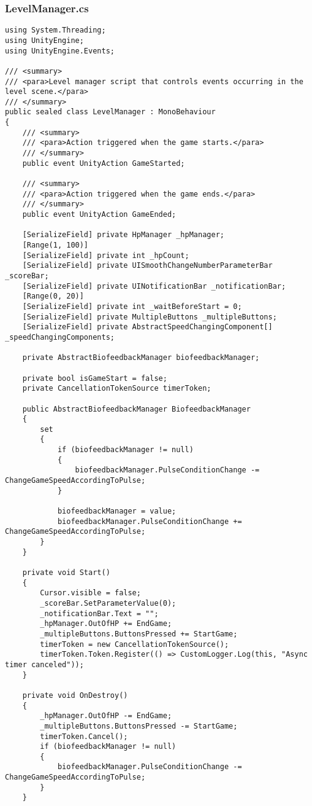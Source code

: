 \subsubsection*{LevelManager.cs}
\begin{verbatim}
using System.Threading;
using UnityEngine;
using UnityEngine.Events;

/// <summary>
/// <para>Level manager script that controls events occurring in the level scene.</para>
/// </summary>
public sealed class LevelManager : MonoBehaviour
{
    /// <summary>
    /// <para>Action triggered when the game starts.</para>
    /// </summary>
    public event UnityAction GameStarted;

    /// <summary>
    /// <para>Action triggered when the game ends.</para>
    /// </summary>
    public event UnityAction GameEnded;

    [SerializeField] private HpManager _hpManager;
    [Range(1, 100)] 
    [SerializeField] private int _hpCount;
    [SerializeField] private UISmoothChangeNumberParameterBar _scoreBar;
    [SerializeField] private UINotificationBar _notificationBar;
    [Range(0, 20)]
    [SerializeField] private int _waitBeforeStart = 0;
    [SerializeField] private MultipleButtons _multipleButtons;
    [SerializeField] private AbstractSpeedChangingComponent[] _speedChangingComponents;
    
    private AbstractBiofeedbackManager biofeedbackManager;

    private bool isGameStart = false;
    private CancellationTokenSource timerToken;

    public AbstractBiofeedbackManager BiofeedbackManager
    {
        set
        {
            if (biofeedbackManager != null)
            {
                biofeedbackManager.PulseConditionChange -= ChangeGameSpeedAccordingToPulse;
            }

            biofeedbackManager = value;
            biofeedbackManager.PulseConditionChange += ChangeGameSpeedAccordingToPulse;
        }
    }

    private void Start()
    {
        Cursor.visible = false;
        _scoreBar.SetParameterValue(0);
        _notificationBar.Text = "";
        _hpManager.OutOfHP += EndGame;
        _multipleButtons.ButtonsPressed += StartGame;
        timerToken = new CancellationTokenSource();
        timerToken.Token.Register(() => CustomLogger.Log(this, "Async timer canceled"));
    }

    private void OnDestroy()
    {
        _hpManager.OutOfHP -= EndGame;
        _multipleButtons.ButtonsPressed -= StartGame;
        timerToken.Cancel();
        if (biofeedbackManager != null)
        {
            biofeedbackManager.PulseConditionChange -= ChangeGameSpeedAccordingToPulse;
        }
    }


\end{verbatim}
